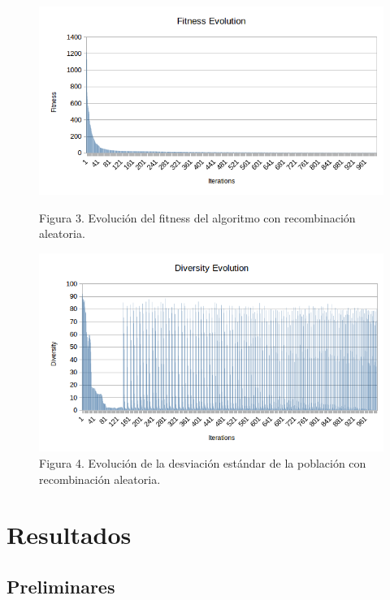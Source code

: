 \documentclass[10pt,journal,compsoc]{styles/IEEEtran}
\begin{document}
\begin{figure}
\begin{minipage}[t]{0.45\textwidth}
\includegraphics[width=\linewidth]{fitness2.png}
\caption{Figura 3. Evolución del fitness del algoritmo con recombinaci\'on aleatoria.}
\label{fig:distal}
\end{minipage}
\hspace{\fill}
\begin{minipage}[t]{0.45\textwidth}
\includegraphics[width=\linewidth]{diversity2.png}
\caption{Figura 4. Evolución de la desviación estándar de la población con recombinaci\'on aleatoria.}
\label{fig:combined}
\end{minipage}

\end{figure}

\section{Resultados}

\subsection{Preliminares}
\end{document}
